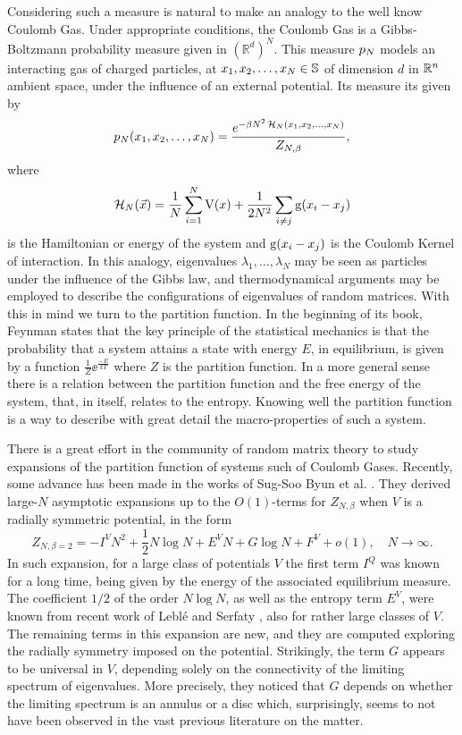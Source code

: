 Considering such a measure is natural to make an analogy to the well know Coulomb Gas. Under appropriate conditions, the Coulomb Gas is a Gibbs-Boltzmann probability measure given in $(\mathbb R^d)^N$. This measure $p_N$ models an interacting gas of charged particles, at $x_1, x_2, \dots, x_N \in \mathbb{S}$ of dimension $d$ in $\mathbb{R}^n$ ambient space, under the influence of an external potential. Its measure its given by 
\begin{equation}
	p_N(x_1, x_2, \dots, x_N) = \frac{e^{-\beta N^2 \operatorname{\mathcal{H}}_N(x_1, x_2, \dots, x_N)}}{Z_{N,\beta}},
	\label{Equação: Medida Gas de Coulomb}
\end{equation}
where $$\operatorname{\mathcal{H}}_N(\vec{x}) = \frac{1}{N} \sum_{i = 1}^{N} \operatorname{V}(x) + \frac{1}{2N^2} \sum_{i \neq j} \operatorname{g}(x_i - x_j)$$ is the Hamiltonian or energy of the system and $\operatorname{g}(x_i - x_j)$ is the Coulomb Kernel of interaction. In this analogy, eigenvalues $\lambda_1,\hdots, \lambda_N$ may be seen as particles under the influence of the Gibbs law, and thermodynamical arguments may be employed to describe the configurations of eigenvalues of random matrices. With this in mind we turn to the partition function. In the beginning of its book, Feynman states \cite{feynmanstatistical} that the key principle of the statistical mechanics is that the probability that a system attains a state with energy $E$, in equilibrium, is given by a function $\frac{1}{Z} \ee^{\frac{-E}{kT}}$ where $Z$ is the partition function. In a more general sense there is a relation between the partition function and the free energy of the system, that, in itself, relates to the entropy. Knowing well the partition function is a way to describe with great detail the macro-properties of such a system.

There is a great effort in the community of random matrix theory to study expansions of the partition function of systems such of Coulomb Gases. Recently, some advance has been made in the works of Sug-Soo Byun et al. \cite{Byun_2023}. They derived large-$N$ asymptotic expansions up to the $O(1)$-terms for  $Z_{N,\beta}$ when $V$ is a radially symmetric potential, in the form
%
$$
Z_{N,\beta=2}=-I^VN^2+\frac{1}{2}N\log N+E^V N+G\log N+F^V + o(1),\quad N\to \infty.
$$
%
In such expansion, for a large class of potentials $V$ the first term $I^Q$ was known for a long time, being given by the energy of the associated equilibrium measure. The coefficient $1/2$ of the order $N\log N$, as well as the entropy term $E^V$, were known from recent work of Leblé and Serfaty \cite{leblé2017large}, also for rather large classes of $V$. The remaining terms in this expansion are new, and they are computed exploring the radially symmetry imposed on the potential. Strikingly, the term $G$ appears to be universal in $V$, depending solely on the connectivity of the limiting spectrum of eigenvalues. More precisely, they noticed that $G$ depends on whether the limiting spectrum is an annulus or a disc which, surprisingly, seems to not have been observed in the vast previous literature on the matter. 

